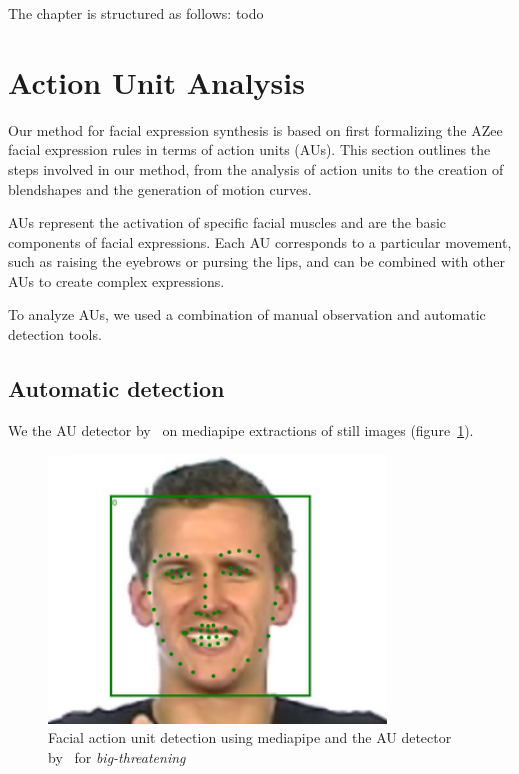 \documentclass[../../main]{subfiles}
\begin{document}
The chapter is structured as follows:  todo

\section{Action Unit Analysis}
\label{ch:facial_expressions:action_unit_analysis}

Our method for facial expression synthesis is based on first formalizing the AZee facial expression rules in terms of action units (AUs). This section outlines the steps involved in our method, from the analysis of action units to the creation of blendshapes and the generation of motion curves.

AUs represent the activation of specific facial muscles and are the basic components of facial expressions. Each AU corresponds to a particular movement, such as raising the eyebrows or pursing the lips, and can be combined with other AUs to create complex expressions.

To analyze AUs, we used a combination of manual observation and automatic detection tools.

\subsection{Automatic detection}
\label{ch:facial_expressions:action_unit_analysis:automatic_detection}

We the AU detector by~\cite{luo2022learning} on mediapipe extractions of still images (figure~\ref{ch:facial_expressions:fig:face_detect}).

\begin{figure}
    \centering
    \includegraphics[width=0.8\textwidth]{chapters/facial_expressions/images/face_detect.png}
    \caption{Facial action unit detection using mediapipe and the AU detector by~\cite{luo2022learning} for \emph{big-threatening}}
    \label{ch:facial_expressions:fig:face_detect}
\end{figure}
\end{document}
